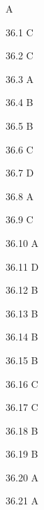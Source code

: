 \begin{Solution}{36}
A
\end{Solution}
\begin{Solution}{36.{1}}
C
\end{Solution}
\begin{Solution}{36.{2}}
C
\end{Solution}
\begin{Solution}{36.{3}}
A
\end{Solution}
\begin{Solution}{36.{4}}
B
\end{Solution}
\begin{Solution}{36.{5}}
B
\end{Solution}
\begin{Solution}{36.{6}}
C
\end{Solution}
\begin{Solution}{36.{7}}
D
\end{Solution}
\begin{Solution}{36.{8}}
A
\end{Solution}
\begin{Solution}{36.{9}}
C
\end{Solution}
\begin{Solution}{36.{10}}
A
\end{Solution}
\begin{Solution}{36.{11}}
D
\end{Solution}
\begin{Solution}{36.{12}}
B
\end{Solution}
\begin{Solution}{36.{13}}
B
\end{Solution}
\begin{Solution}{36.{14}}
B
\end{Solution}
\begin{Solution}{36.{15}}
B
\end{Solution}
\begin{Solution}{36.{16}}
C
\end{Solution}
\begin{Solution}{36.{17}}
C
\end{Solution}
\begin{Solution}{36.{18}}
B
\end{Solution}
\begin{Solution}{36.{19}}
B
\end{Solution}
\begin{Solution}{36.{20}}
A
\end{Solution}
\begin{Solution}{36.{21}}
A
\end{Solution}
